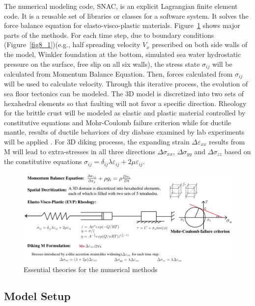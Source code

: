 \documentclass[12pt]{article}
\begin{document}
The numerical modeling code, SNAC, is an explicit Lagrangian finite element code. It is a reusable set of libraries or classes for a software system. It solves the force balance equation for elasto-visco-plastic materials. Figure~\ref{fig7_1} shows major parts of the methods. For each time step, due to boundary conditions (Figure~\ref{fig8_1})(e.g., half spreading velocity $V_{x}$ prescribed on both side walls of the model, Winkler foundation at the bottom, simulated sea water hydrostatic pressure on the surface, free slip on all six walls), the stress state $\sigma_{ij}$ will be calculated from Momentum Balance Equation. Then, forces calculated from $\sigma_{ij}$ will be used to calculate velocity. Through this iterative process, the evolution of sea floor tectonics can be modeled. The 3D model is discretized into two sets of hexahedral elements so that faulting will not favor a specific direction. Rheology for the brittle crust will be modeled as elastic and plastic material controlled by constitutive equations and Mohr-Coulomb failure criterion while for ductile mantle, results of ductile behaviors of dry diabase examined by lab experiments will be applied \citep{Kirby1987}. For 3D diking processs, the expanding strain $\Delta\varepsilon_{xx}$ results from M will lead to extra-stresses in all three directions $\Delta\sigma_{xx}$, $\Delta\sigma_{yy}$ and $\Delta\sigma_{zz}$ based on the constitutive equations $\sigma_{ij}=\delta_{ij}\lambda\varepsilon_{ij}+2\mu\varepsilon_{ij}$.

\begin{figure}[H]
 \centering
  \includegraphics[scale=0.46]{fig7_1.png}
 \caption{\small{Essential theories for the numerical methods}}
 \label{fig7_1}
\end{figure}

\subsection{Model Setup}
\end{document}

